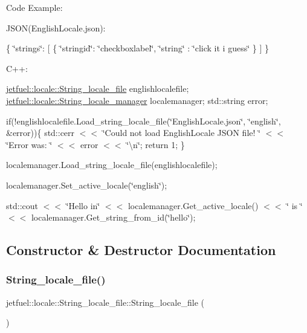 Code Example\+:

J\+S\+ON(English\+Locale.\+json)\+:

\{ \char`\"{}strings\char`\"{}\+: \mbox{[} \{ \char`\"{}stringid\char`\"{}\+: \char`\"{}checkboxlabel\char`\"{}, \char`\"{}string\char`\"{} \+: \char`\"{}click it i guess\char`\"{} \} \mbox{]} \}

C++\+:

\hyperlink{classjetfuel_1_1locale_1_1String__locale__file}{jetfuel\+::locale\+::\+String\+\_\+locale\+\_\+file} englishlocalefile; \hyperlink{classjetfuel_1_1locale_1_1String__locale__manager}{jetfuel\+::locale\+::\+String\+\_\+locale\+\_\+manager} localemanager; std\+::string error;

if(!englishlocalefile.Load\+\_\+string\+\_\+locale\+\_\+file(\char`\"{}\+English\+Locale.\+json\char`\"{}, \char`\"{}english\char`\"{}, \&error))\{ std\+::cerr $<$$<$ \char`\"{}\+Could not load English\+Locale J\+S\+O\+N file! \char`\"{} $<$$<$ \char`\"{}\+Error was\+: \char`\"{} $<$$<$ error $<$$<$ \char`\"{}\textbackslash{}n\char`\"{}; return 1; \}

localemanager.\+Load\+\_\+string\+\_\+locale\+\_\+file(englishlocalefile);

localemanager.\+Set\+\_\+active\+\_\+locale(\char`\"{}english\char`\"{});

std\+::cout $<$$<$ \char`\"{}\+Hello in\char`\"{} $<$$<$ localemanager.\+Get\+\_\+active\+\_\+locale() $<$$<$ \char`\"{} is \char`\"{} $<$$<$ localemanager.\+Get\+\_\+string\+\_\+from\+\_\+id(\char`\"{}hello\char`\"{}); 

\subsection{Constructor \& Destructor Documentation}
\mbox{\label{classjetfuel_1_1locale_1_1String__locale__file_a98b4ccb05ae738101ec1c4af582aa0d8}} 
\subsubsection{\texorpdfstring{String\+\_\+locale\+\_\+file()}{String\_locale\_file()}}
{\footnotesize\ttfamily jetfuel\+::locale\+::\+String\+\_\+locale\+\_\+file\+::\+String\+\_\+locale\+\_\+file (\begin{DoxyParamCaption}{ }\end{DoxyParamCaption})\hspace{0.3cm}{\ttfamily [inline]}}



